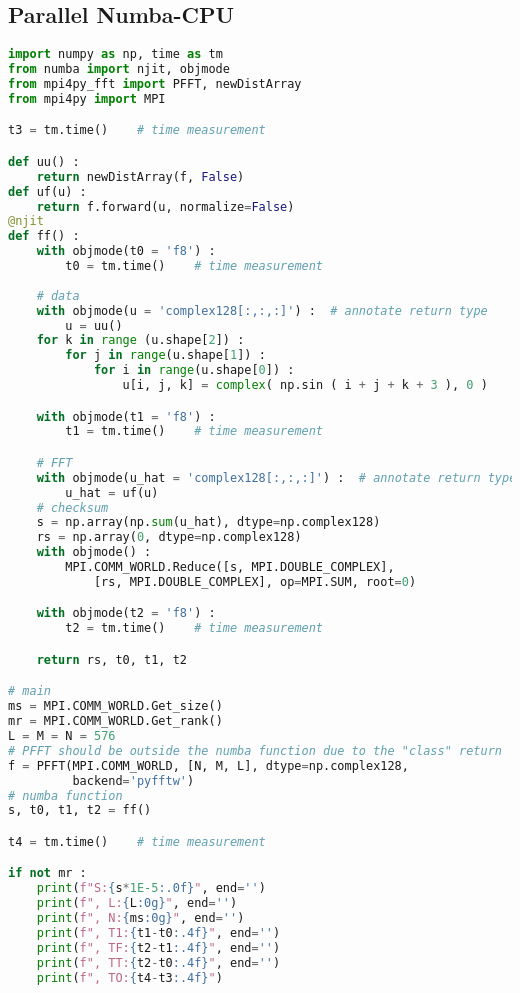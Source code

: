 \subsection{Parallel Numba-CPU}
\begin{lstlisting}[language=Python, caption={Parallel Numba-CPU implementation of the FFT test case.}]
import numpy as np, time as tm
from numba import njit, objmode
from mpi4py_fft import PFFT, newDistArray
from mpi4py import MPI

t3 = tm.time()    # time measurement

def uu() : 
    return newDistArray(f, False)
def uf(u) :
    return f.forward(u, normalize=False)    
@njit
def ff() :
    with objmode(t0 = 'f8') :
        t0 = tm.time()    # time measurement
    
    # data
    with objmode(u = 'complex128[:,:,:]') :  # annotate return type
        u = uu()
    for k in range (u.shape[2]) :
        for j in range(u.shape[1]) :
            for i in range(u.shape[0]) :
                u[i, j, k] = complex( np.sin ( i + j + k + 3 ), 0 )

    with objmode(t1 = 'f8') :
        t1 = tm.time()    # time measurement

    # FFT
    with objmode(u_hat = 'complex128[:,:,:]') :  # annotate return type
        u_hat = uf(u)
    # checksum
    s = np.array(np.sum(u_hat), dtype=np.complex128)
    rs = np.array(0, dtype=np.complex128)
    with objmode() :
        MPI.COMM_WORLD.Reduce([s, MPI.DOUBLE_COMPLEX],
            [rs, MPI.DOUBLE_COMPLEX], op=MPI.SUM, root=0)

    with objmode(t2 = 'f8') :
        t2 = tm.time()    # time measurement

    return rs, t0, t1, t2

# main
ms = MPI.COMM_WORLD.Get_size()
mr = MPI.COMM_WORLD.Get_rank()
L = M = N = 576
# PFFT should be outside the numba function due to the "class" return
f = PFFT(MPI.COMM_WORLD, [N, M, L], dtype=np.complex128,
         backend='pyfftw')
# numba function
s, t0, t1, t2 = ff()

t4 = tm.time()    # time measurement

if not mr :
    print(f"S:{s*1E-5:.0f}", end='')
    print(f", L:{L:0g}", end='')
    print(f", N:{ms:0g}", end='')
    print(f", T1:{t1-t0:.4f}", end='')
    print(f", TF:{t2-t1:.4f}", end='')
    print(f", TT:{t2-t0:.4f}", end='')
    print(f", TO:{t4-t3:.4f}")
\end{lstlisting}





